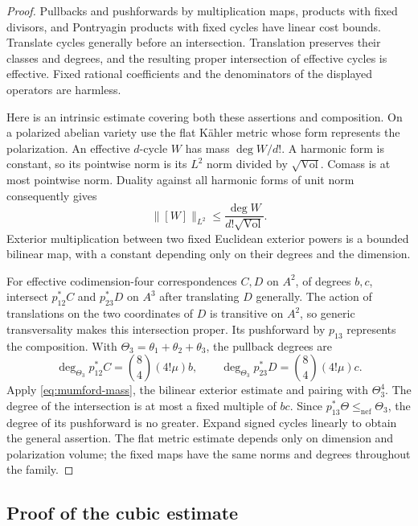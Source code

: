 \documentclass[11pt]{article}
\theoremstyle{definition}
\theoremstyle{remark}
\begin{document}
\begin{proof}
Pullbacks and pushforwards by multiplication maps, products with fixed
divisors, and Pontryagin products with fixed cycles have linear cost
bounds. Translate cycles generally before an intersection. Translation
preserves their classes and degrees, and the resulting proper
intersection of effective cycles is effective.
Fixed rational coefficients and the denominators of the displayed
operators are harmless.

Here is an intrinsic estimate covering both these assertions and
composition. On a polarized abelian variety use the flat K\"ahler
metric whose form represents the polarization. An effective
$d$-cycle $W$ has mass $\deg W/d!$. A harmonic form is constant, so
its pointwise norm is its $L^2$ norm divided by
$\sqrt{\operatorname{Vol}}$. Comass is at most pointwise norm.
Duality against all harmonic forms of unit norm consequently gives
\begin{equation}\label{eq:mumford-mass}
 \|[W]\|_{L^2}\leq
       \frac{\deg W}{d!\sqrt{\operatorname{Vol}}}.
\end{equation}
Exterior multiplication between two fixed Euclidean exterior powers
is a bounded bilinear map, with a constant depending only on their
degrees and the dimension.

For effective codimension-four correspondences $C,D$ on $A^2$, of
degrees $b,c$, intersect $p_{12}^*C$ and $p_{23}^*D$ on $A^3$
after translating $D$ generally. The action of translations on
the two coordinates of $D$ is transitive on $A^2$, so generic
transversality makes this intersection proper.
Its pushforward by $p_{13}$ represents the composition.
With $\Theta_3=\theta_1+\theta_2+\theta_3$, the pullback degrees are
\[
 \deg_{\Theta_3}p_{12}^*C
   =\binom84(4!\mu)b,\qquad
 \deg_{\Theta_3}p_{23}^*D
   =\binom84(4!\mu)c.
\]
Apply \eqref{eq:mumford-mass}, the bilinear exterior estimate and pairing with
$\Theta_3^4$. The degree of the intersection is at most a fixed
multiple of $bc$. Since
$p_{13}^*\Theta\leq_{\mathrm{nef}}\Theta_3$, the degree of its
pushforward is no greater. Expand signed cycles linearly to obtain
the general assertion. The flat metric estimate depends only on
dimension and polarization volume; the fixed maps have the same
norms and degrees throughout the family.
\end{proof}

\subsection{Proof of the cubic estimate}
\end{document}
